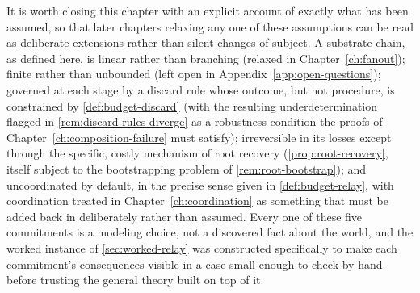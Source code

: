 It is worth closing this chapter with an explicit account of exactly what
has been assumed, so that later chapters relaxing any one of these
assumptions can be read as deliberate extensions rather than silent
changes of subject. A substrate chain, as defined here, is linear rather
than branching (relaxed in Chapter~\ref{ch:fanout}); finite rather than
unbounded (left open in Appendix~\ref{app:open-questions}); governed at
each stage by a discard rule whose outcome, but not procedure, is
constrained by \cref{def:budget-discard} (with the resulting
underdetermination flagged in \cref{rem:discard-rules-diverge} as a
robustness condition the proofs of Chapter~\ref{ch:composition-failure}
must satisfy); irreversible in its losses except through the specific,
costly mechanism of root recovery (\cref{prop:root-recovery}, itself
subject to the bootstrapping problem of \cref{rem:root-bootstrap}); and
uncoordinated by default, in the precise sense given in
\cref{def:budget-relay}, with coordination treated in
Chapter~\ref{ch:coordination} as something that must be added back in
deliberately rather than assumed. Every one of these five commitments is a
modeling choice, not a discovered fact about the world, and the worked
instance of \cref{sec:worked-relay} was constructed specifically to make
each commitment's consequences visible in a case small enough to check by
hand before trusting the general theory built on top of it.
